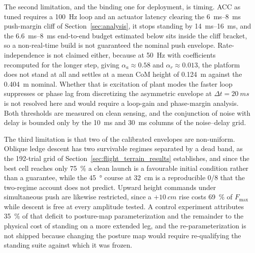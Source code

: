 \documentclass[a4paper,fleqn]{cas-dc}
\begin{document}
The second limitation, and the binding one for deployment, is timing. ACC as
tuned requires a \SI{100}{Hz} loop and an actuator latency clearing the \SIrange{6}{8}{ms}
push-margin cliff of Section~\ref{sec:analysis}, it stops standing by
\SIrange{14}{16}{ms}, and the \SIrange{6.6}{8}{ms} end-to-end budget estimated
below sits inside the cliff bracket, so a non-real-time build is not guaranteed
the nominal push envelope. Rate-independence is not claimed either, because at
\SI{50}{Hz} with coefficients recomputed for the longer step, giving
$\alpha_a{\approx}0.58$ and $\alpha_r{\approx}0.013$, the platform does not
stand at all and settles at a mean CoM height of \SI{0.124}{m} against the
\SI{0.404}{m} nominal. Whether that is excitation of plant modes the faster loop
suppresses or phase lag from discretizing the asymmetric envelope at
$\Delta t{=}\SI{20}{ms}$ is not resolved here and would require a loop-gain and
phase-margin analysis. Both thresholds are measured on clean sensing, and the
conjunction of noise with delay is bounded only by the \SI{10}{ms} and
\SI{30}{ms} columns of the noise--delay grid.

The third limitation is that two of the calibrated envelopes are non-uniform.
Oblique ledge descent has two survivable regimes separated by a dead band, as
the \num{192}-trial grid of Section~\ref{sec:flight_terrain_results} establishes, and since the
best cell reaches only \SI{75}{\percent} a clean launch is a favourable initial
condition rather than a guarantee, while the \SI{45}{\degree} course at
\SI{32}{cm} is a reproducible \num{0}/\num{8} that the two-regime account does
not predict. Upward height commands under simultaneous push are likewise
restricted, since a ${+}\SI{10}{cm}$ rise costs \SI{69}{\percent} of $F_{\max}$
while descent is free at every amplitude tested. A control experiment attributes
\SI{35}{\percent} of that deficit to posture-map parameterization and the
remainder to the physical cost of standing on a more extended leg, and the
re-parameterization is not shipped because changing the posture map would
require re-qualifying the standing suite against which it was frozen.
\end{document}
